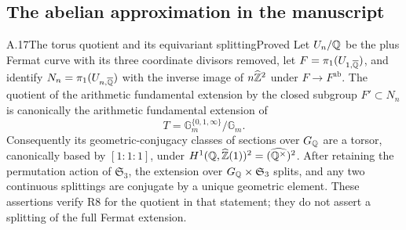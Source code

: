 \subsection{The abelian approximation in the manuscript}

\begin{statement}{A.17}{The torus quotient and its equivariant splitting}{Proved}
Let $U_n/\mathbb Q$ be the plus Fermat curve with its three coordinate divisors
removed, let $F=\pi_1(U_{1,\overline{\mathbb Q}})$, and identify
$N_n=\pi_1(U_{n,\overline{\mathbb Q}})$ with the inverse image of
$n\widehat{\mathbb Z}^2$ under $F\to F^{\mathrm{ab}}$.
The quotient of the arithmetic fundamental extension by the closed
subgroup $F'\subset N_n$ is canonically the arithmetic fundamental
extension of
\[
 T=\mathbb G_m^{\{0,1,\infty\}}/\mathbb G_m.
\]
Consequently its geometric-conjugacy classes of sections over $G_\mathbb Q$
are a torsor, canonically based by $[1:1:1]$, under
$H^1(\mathbb Q,\widehat{\mathbb Z}(1))^2=(\widehat{\mathbb Q^\times})^2$.
After retaining the permutation action of $\mathfrak S_3$, the extension
over $G_\mathbb Q\times\mathfrak S_3$ splits, and any two continuous splittings
are conjugate by a unique geometric element. These assertions verify R8
for the quotient in that statement; they do not assert a splitting of
the full Fermat extension.
\end{statement}
